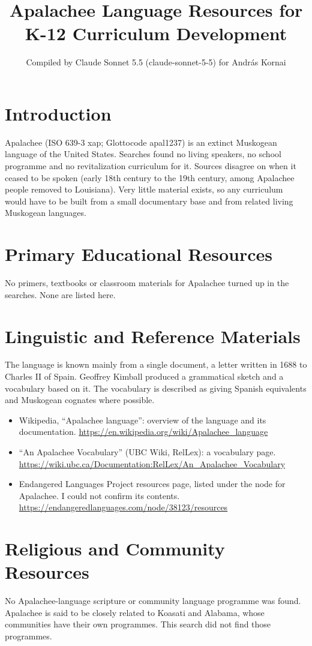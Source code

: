 \documentclass[12pt]{article}
\title{Apalachee Language Resources for K-12 Curriculum Development}
\author{Compiled by Claude Sonnet 5.5 (claude-sonnet-5-5) for Andr\'as Kornai}
\date{}
\begin{document}
\maketitle

\section{Introduction}
Apalachee (ISO 639-3 xap; Glottocode apal1237) is an extinct Muskogean language of the United States. Searches found no living speakers, no school programme and no revitalization curriculum for it. Sources disagree on when it ceased to be spoken (early 18th century to the 19th century, among Apalachee people removed to Louisiana). Very little material exists, so any curriculum would have to be built from a small documentary base and from related living Muskogean languages.

\section{Primary Educational Resources}
No primers, textbooks or classroom materials for Apalachee turned up in the searches. None are listed here.

\section{Linguistic and Reference Materials}
The language is known mainly from a single document, a letter written in 1688 to Charles II of Spain. Geoffrey Kimball produced a grammatical sketch and a vocabulary based on it. The vocabulary is described as giving Spanish equivalents and Muskogean cognates where possible.
\begin{itemize}
\item Wikipedia, ``Apalachee language'': overview of the language and its documentation. \url{https://en.wikipedia.org/wiki/Apalachee_language}
\item ``An Apalachee Vocabulary'' (UBC Wiki, RelLex): a vocabulary page. \url{https://wiki.ubc.ca/Documentation:RelLex/An_Apalachee_Vocabulary}
\item Endangered Languages Project resources page, listed under the node for Apalachee. I could not confirm its contents. \url{https://endangeredlanguages.com/node/38123/resources}
\end{itemize}

\section{Religious and Community Resources}
No Apalachee-language scripture or community language programme was found. Apalachee is said to be closely related to Koasati and Alabama, whose communities have their own programmes. This search did not find those programmes.
\end{document}
